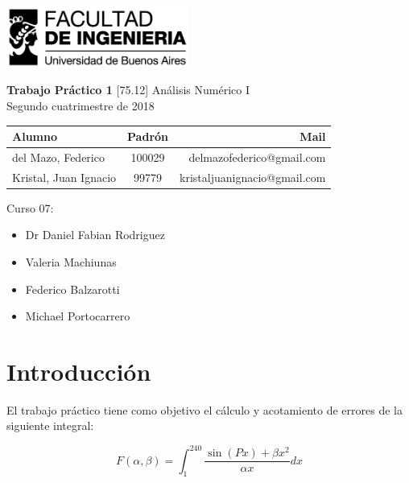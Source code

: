 \documentclass[11pt,a4paper]{article}
\begin{document}
\begin{titlepage}
	\hfill\includegraphics[width=6cm]{figuras/fiuba.jpg}
    \begin{center}
    \vfill
    \Huge \textbf{Trabajo Práctico 1}
    \vskip2cm
    \Large [75.12] Análisis Numérico I\\
    Segundo cuatrimestre de 2018
    \vfill
    \begin{tabular}{|l|c|r|}
	\hline
	Alumno & Padrón & Mail\\
	\hline
	\hline
	del Mazo, Federico & 100029 & delmazofederico@gmail.com\\
	\hline
	Kristal, Juan Ignacio & 99779 & kristaljuanignacio@gmail.com\\
	\hline
	\end{tabular}
    \vskip2cm
    \end{center}

    Curso 07:

    \begin{itemize}
    \item Dr Daniel Fabian Rodriguez
    \item Valeria Machiunas
    \item Federico Balzarotti
    \item Michael Portocarrero
    \end{itemize}

\end{titlepage}



\tableofcontents
\thispagestyle{onlyheader}
\newpage

\setcounter{page}{1}

\section{Introducción}
El trabajo práctico tiene como objetivo el cálculo y acotamiento de errores de la siguiente integral:

\begin{equation}
    F(\alpha,\beta) = \int_{1}^{240}  \frac{\sin{(P x)}  + \beta x^2}{\alpha x} dx 
\end{equation}
\end{document}
